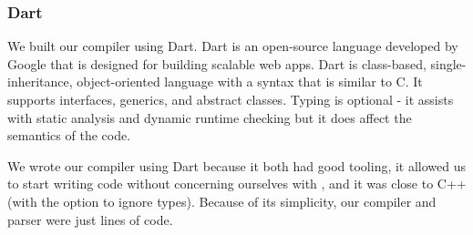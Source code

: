 
\subsubsection{Dart}
We built our compiler using Dart\cite{dartlang}.
Dart is an open-source language developed by Google that is
designed for building scalable web apps. Dart is class-based,
single-inheritance,
object-oriented language with a syntax that is similar to C. It supports
interfaces, generics, and abstract classes. Typing is optional - it assists
with static analysis and dynamic runtime checking but it does affect the
semantics of the code.

We wrote our compiler using Dart because it both had good tooling, it allowed
	us to start writing code without concerning ourselves with ,
	and it was close to C++ (with the option to ignore types).
Because of its simplicity, our compiler and parser were just  lines of code.